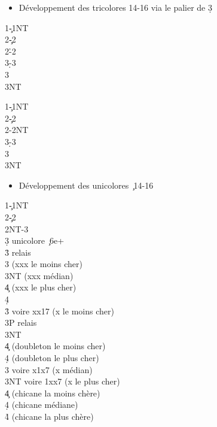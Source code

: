 \documentclass[a4paper]{article}
\begin{document}
\begin{itemize}
\item Développement des tricolores 14-16 via le palier de 3\d 

\end{itemize}

\begin{bidtable}
1\c-1NT\\
2\c-2\d\\
2\h-2\s\\
3\d-3\h\\
3\s {}\\
3NT 
\end{bidtable}

\begin{bidtable}
1\c-1NT\\
2\c-2\d\\
2\s-2NT\\
3\d-3\h\\
3\s {}\\
3NT 
\end{bidtable}

\begin{itemize}
\item Développement des unicolores \c\ 14-16

\end{itemize}

\begin{bidtable}
1\c-1NT\\
2\c-2\d\\
2NT-3\c\\
3\d \> unicolore \c\ 6e+\+\\
3\h \> relais\+\\
3\s {} (xxx le moins cher)\-\\
3NT  (xxx médian)\\
4\c {} (xxx le plus cher)\\
4\d {}\-\\
3\h {} voire xx17 (x le moins cher)\+\\
3P \> relais\+\\
3NT \\
4\c {} (doubleton le moins cher)\\
4\d {} (doubleton le plus cher)\-\-\\
3\s {} voire x1x7 (x médian)\\
3NT  voire 1xx7 (x le plus cher)\\
4\c {} (chicane la moins chère)\\
4\d {} (chicane médiane)\\
4\h {} (chicane la plus chère)
\end{bidtable}
\end{document}
